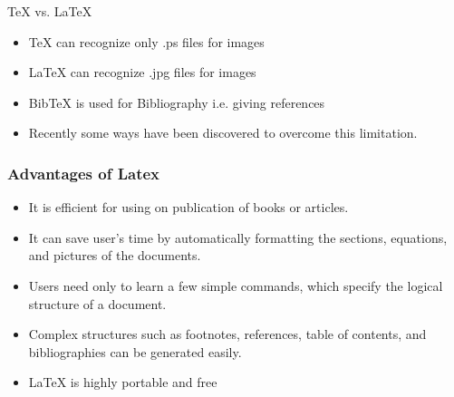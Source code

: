 \documentclass [9pt] {beamer}
\begin{document}
\begin{frame}{TeX vs. LaTeX}
\begin{itemize}
	\item TeX can recognize only .ps files for images
	\item LaTeX can recognize .jpg files for images
	\item BibTeX is used for Bibliography i.e. giving references
	\item Recently some ways have been discovered to overcome this limitation. 
\end{itemize}
\end{frame}

\begin{frame}\frametitle{Advantages of Latex}
\rm
\fontsize{9pt}{11pt}\selectfont
\begin{itemize}
\fontsize{8pt}{10pt}\selectfont

\item It is efficient for using on publication of books or articles.\\[.30cm]

\item It can save  user's time by automatically formatting the sections, equations, and pictures of the documents.\\[.30cm]

\item Users need only to learn a few simple commands, which specify the logical structure of a document.\\[.30cm]

\item Complex structures such as footnotes, references, table of contents, and bibliographies can be generated easily.\\[.30cm]

\item \textcolor[rgb]{0.98,0.00,0.00}{LaTeX is highly portable and free}
\end{itemize}
\end{frame}
\end{document}
